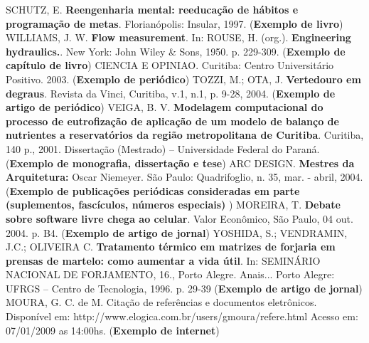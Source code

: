 \documentclass[]{seti2}
\begin{document}
\clearpage %
\begin{thebibliography}{50}%
			 SCHUTZ, E. \textbf{Reengenharia mental: reeducação de hábitos e programação de metas}. Florianópolis: Insular, 1997. ({\textbf{Exemplo de livro}})
			 WILLIAMS, J. W. \textbf{Flow measurement}. In: ROUSE, H. (org.). \textbf{Engineering hydraulics.}. New York: John Wiley \& Sons, 1950. p. 229-309. ({\textbf{Exemplo de capítulo de livro}})
			 CIENCIA E OPINIAO. Curitiba: Centro Universitário Positivo. 2003. ({\textbf{Exemplo de periódico}})
			 TOZZI, M.; OTA, J.  \textbf{Vertedouro em degraus}. Revista da Vinci, Curitiba, v.1, n.1, p. 9-28, 2004. ({\textbf{Exemplo de artigo de periódico}})
			 VEIGA, B. V.  \textbf{Modelagem computacional do processo de eutrofização de aplicação de um modelo de balanço de nutrientes a reservatórios da região metropolitana de Curitiba}. Curitiba, 140 p., 2001. Dissertação (Mestrado) – Universidade Federal do Paraná. ({\textbf{Exemplo de monografia, dissertação e tese}})
			 ARC DESIGN. \textbf{Mestres da Arquitetura:} Oscar Niemeyer. São Paulo: Quadrifoglio, n. 35, mar. - abril, 2004. ({\textbf{Exemplo de publicações periódicas consideradas em parte (suplementos, fascículos, números especiais) }})
			 MOREIRA, T. \textbf{Debate sobre software livre chega ao celular}. Valor Econômico, São Paulo, 04 out. 2004. p. B4. ({\textbf{Exemplo de artigo de jornal}})
			 YOSHIDA, S.; VENDRAMIN, J.C.; OLIVEIRA C. \textbf{Tratamento térmico em matrizes de forjaria em prensas de martelo: como aumentar a vida útil}. In: SEMINÁRIO NACIONAL DE FORJAMENTO, 16., Porto Alegre. Anais... Porto Alegre: UFRGS – Centro de Tecnologia, 1996. p. 29-39 ({\textbf{Exemplo de artigo de jornal}})
			 MOURA, G. C. de M. Citação de referências e documentos eletrônicos. Disponível em: \textcolor[rgb]{0,0,1}{http://www.elogica.com.br/users/gmoura/refere.html} Acesso em: 07/01/2009 as 14:00hs. ({\textbf{Exemplo de internet}})
\end{thebibliography}
\end{document}
